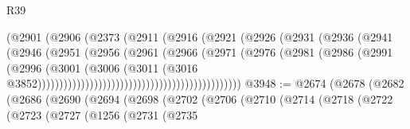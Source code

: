 \begin{lexlean}{R39}
\begin{coremodule}
                                                (@2901
                                                  (@2906
                                                    (@2373
                                                      (@2911
                                                        (@2916
                                                          (@2921
                                                            (@2926
                                                              (@2931
                                                                (@2936
                                                                  (@2941
                                                                    (@2946
                                                                      (@2951
                                                                        (@2956
                                                                          (@2961
                                                                            (@2966
                                                                              (@2971
                                                                                (@2976
                                                                                  (@2981
                                                                                    (@2986
                                                                                      (@2991
                                                                                        (@2996
                                                                                          (@3001
                                                                                            (@3006
                                                                                              (@3011
                                                                                                (@3016
                                                                                                  @3852)))))))))))))))))))))))))))))))))))))))))))))))
@3948 := @2674
    (@2678
      (@2682
        (@2686
          (@2690
            (@2694
              (@2698
                (@2702
                  (@2706
                    (@2710
                      (@2714
                        (@2718
                          (@2722
                            (@2723
                              (@2727
                                (@1256
                                  (@2731
                                    (@2735

\end{coremodule}
\end{lexlean}
